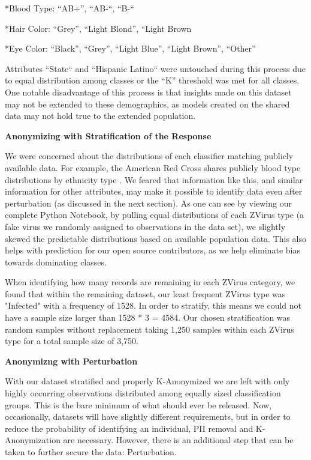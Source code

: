 \documentclass[10pt,journal,compsoc]{IEEEtran}
\begin{document}
		*Blood Type: “AB+”, “AB-“, “B-“ 
		
		*Hair Color: “Grey”, “Light Blond”, “Light Brown
		
		*Eye Color: “Black”, “Grey”, “Light Blue”, “Light Brown”, “Other”

Attributes ``State`` and ``Hispanic Latino`` were untouched during this process due to equal distribution among classes or the “K” threshold was met for all classes.  One notable disadvantage of this process is that insights made on this dataset may not be extended to these demographics, as models created on the shared data may not hold true to the extended population.\linebreak

\noindent \textbf{ Anonymizing with Stratification of the Response}

We were concerned about the distributions of each classifier matching publicly available data. For example, the American Red Cross shares publicly blood type distributions by ethnicity type . We feared that information like this, and similar information for other attributes, may make it possible to identify data even after perturbation (as discussed in the next section). As one can see by viewing our complete Python Notebook, by pulling equal distributions of each ZVirus type (a fake virus we randomly assigned to observations in the data set), we slightly skewed the predictable distributions based on available population data. This also helps with prediction for our open source contributors, as we help eliminate bias towards dominating classes.

When identifying how many records are remaining in each ZVirus category, we found that within the remaining dataset, our least frequent ZVirus type was "Infected" with a frequency of 1528. In order to stratify, this means we could not have a sample size larger than 1528 * 3 = 4584. Our chosen stratification was random samples without replacement taking 1,250 samples within each ZVirus type for a total sample size of 3,750.\linebreak

\noindent \textbf{Anonymizng with Perturbation}

With our dataset stratified and properly K-Anonymized we are left with only highly occurring observations distributed among equally sized classification groups. This is the bare minimum of what should ever be released. Now, occasionally,  datasets will have slightly different requirements, but in order to reduce the probability of identifying an individual, PII removal and K-Anonymization are necessary.  However, there is an additional step that can be taken to further secure the data: Perturbation.
\end{document}
